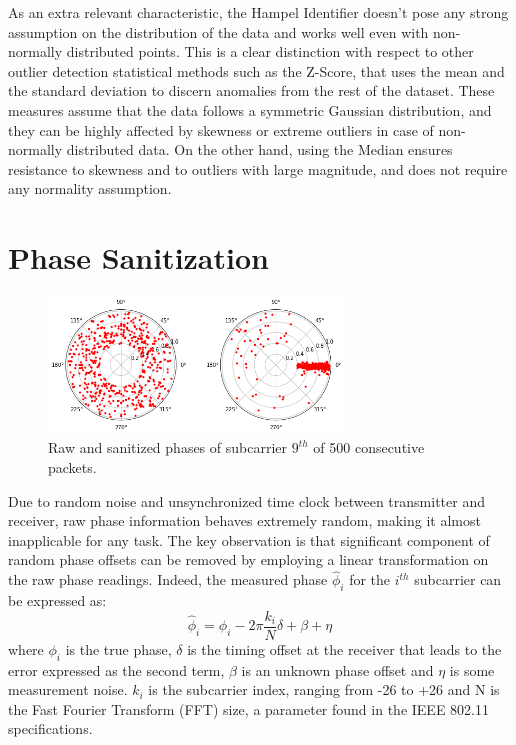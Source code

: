 \documentclass[binding=0.7cm, oneside]{sapthesis}
\begin{document}
As an extra relevant characteristic, the Hampel Identifier doesn't pose any strong assumption on the distribution of the data and works well even with non-normally distributed points. This is a clear distinction
with respect to other outlier detection statistical methods such as the Z-Score, that uses the mean and the standard deviation to discern anomalies
from the rest of the dataset. These measures assume that the data follows a symmetric Gaussian distribution, and they can be highly affected by skewness
or extreme outliers in case of non-normally distributed data. On the other hand, using the Median ensures resistance to skewness and to outliers with large
magnitude, and does not require any normality assumption.

\section{Phase Sanitization}
\begin{figure}[h]
    \centering
    \includegraphics[width=0.70\textwidth]{images/phaseTransform.png}
    \caption{Raw and sanitized phases of subcarrier $9^{th}$ of 500 consecutive packets.}
    \label{fig:phase_cal}
\end{figure}
Due to random noise and unsynchronized time clock between transmitter and receiver, raw phase information behaves extremely random, making it almost inapplicable for any task.
The key observation is that significant component of random phase offsets can be removed by employing a linear transformation \cite{Phase_cal1,Phase_cal2,Phase_cal3} on the raw phase readings.
Indeed, the measured phase $\hat{\phi}_i$ for the $i^{th}$ subcarrier can be expressed as:
$$\hat{\phi}_i = {\phi}_i - 2\pi\frac{k_i}{N}\delta + \beta +\eta$$
where $\phi_i$ is the true phase, $\delta$ is the timing offset at the receiver that leads to the error expressed as the second term, $\beta$ is an unknown phase offset and $\eta$ is some measurement noise.
$k_i$ is the subcarrier index, ranging from -26 to +26 and N is the Fast Fourier Transform (FFT) size, a parameter found in the IEEE 802.11 specifications.
\end{document}
